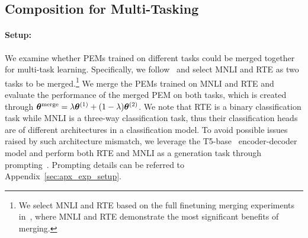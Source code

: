 \subsection{Composition for Multi-Tasking}
\label{sec:multitask}

\paragraph{Setup:}
We examine whether PEMs trained on different tasks could be merged together for multi-task learning. 
Specifically, we follow~\citet{matena2022merging} and select MNLI and RTE as two tasks to be merged.\footnote{We select MNLI and RTE based on the full finetuning merging experiments in~\citet{matena2022merging}, where MNLI and RTE demonstrate the most significant benefits of merging.} 
We merge the PEMs trained on MNLI and RTE and evaluate the performance of the merged PEM on both tasks, which is created through ${\bm{\theta}}^{\text{merge}} = \lambda{\bm{\theta}}^{(1)} + (1-\lambda){\bm{\theta}}^{(2)}$. 
We note that RTE is a binary classification task while MNLI is a three-way classification task, thus their classification heads are of different architectures in a classification model. 
To avoid possible issues raised by such architecture mismatch, we leverage the T5-base~\citep{raffel2020exploring} encoder-decoder model and perform both RTE and MNLI as a generation task through prompting~\citep{liu2023pre}. 
Prompting details can be referred to Appendix~\ref{sec:apx_exp_setup}.


